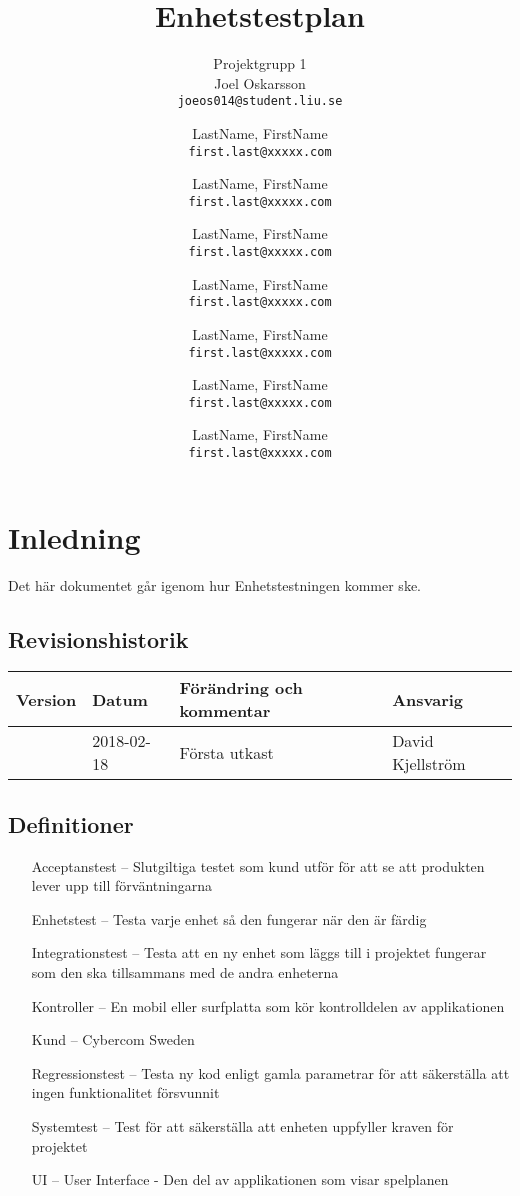 \documentclass[10pt]{article}
\title{Enhetstestplan}
\author{
	Projektgrupp 1\\
	Joel Oskarsson\\
	\texttt{joeos014@student.liu.se}
	\and
	LastName, FirstName\\
	\texttt{first.last@xxxxx.com}
	\and
	LastName, FirstName\\
	\texttt{first.last@xxxxx.com}
	\and
	LastName, FirstName\\
	\texttt{first.last@xxxxx.com}
	\and
	LastName, FirstName\\
	\texttt{first.last@xxxxx.com}
  	\and
  	LastName, FirstName\\
  	\texttt{first.last@xxxxx.com}
  	\and
  	LastName, FirstName\\
  	\texttt{first.last@xxxxx.com}
  	\and
  	LastName, FirstName\\
  	\texttt{first.last@xxxxx.com}
}
\begin{document}
\maketitle
\pagebreak
\tableofcontents
\pagebreak
\section{Inledning}
	Det här dokumentet går igenom hur Enhetstestningen kommer ske.
	\subsection{Revisionshistorik}

	
	\begin{center}
 	   \begin{tabular}{| l | l | l |  l | }
 	       \hline
 	       \textbf{Version} & \textbf{Datum} & \textbf{Förändring och kommentar} & \textbf{Ansvarig} \\
 	       \hline
 	       \centering 0.1 & 2018-02-18 & Första utkast & David Kjellström\\
 	       \hline
 	   \end{tabular}
	\end{center}


	\subsection{Definitioner}
		\begin{itemize}
		\item [Acceptanstest --]Slutgiltiga testet som kund utför för att se att produkten lever upp till förväntningarna
		\item [Enhetstest --]Testa varje enhet så den fungerar när den är färdig
		\item [Integrationstest --]Testa att en ny enhet som läggs till i projektet fungerar som den ska tillsammans med de andra enheterna
		\item [Kontroller --]En mobil eller surfplatta som kör kontrolldelen av applikationen
		\item [Kund --]Cybercom Sweden
		\item [Regressionstest --]Testa ny kod enligt gamla parametrar för att säkerställa att ingen funktionalitet försvunnit
		\item [Systemtest --]Test för att säkerställa att enheten uppfyller kraven för projektet		
		\item [UI --]User Interface - Den del av applikationen som visar spelplanen
		\end{itemize}
	
\end{document}
